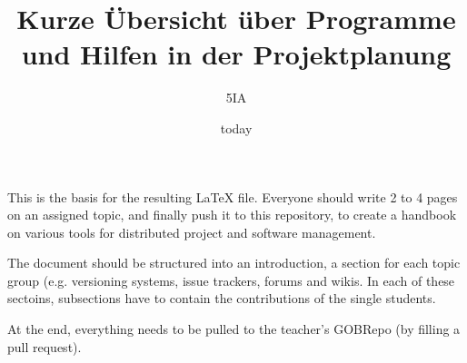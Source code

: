 \documentclass{article}
\title{Kurze Übersicht über Programme und Hilfen in der Projektplanung}
\author{5IA}
\date{today}
\begin{document}
\maketitle














    This is the basis for the resulting LaTeX file.
    Everyone should write 2 to 4 pages on an assigned topic, and finally push it to this repository, to create a handbook on various tools
    for distributed project and software management.
    
    The document should be structured into an introduction, a section for each topic group (e.g. versioning systems, issue trackers, forums and wikis.
    In each of these sectoins, subsections have to contain the contributions of the single students.

    At the end, everything needs to be pulled to the teacher's GOBRepo (by filling a pull request).
\end{document}
